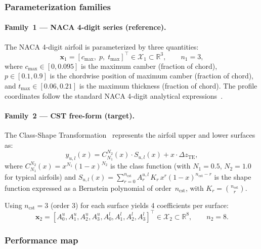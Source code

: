 \subsubsection{Parameterization families}

\paragraph{Family~1 --- NACA 4-digit series (reference).}
The NACA 4-digit airfoil is parameterized by three quantities:
\begin{equation}
    \mathbf{x}_1 = [c_{\max},\; p,\; t_{\max}]^\top \in \mathcal{X}_1 \subset \mathbb{R}^3, \qquad n_1 = 3,
    \label{eq:naca_params}
\end{equation}
where $c_{\max} \in [0, 0.095]$ is the maximum camber (fraction of chord), $p \in [0.1, 0.9]$ is the chordwise position of maximum camber (fraction of chord), and $t_{\max} \in [0.06, 0.21]$ is the maximum thickness (fraction of chord). The profile coordinates follow the standard NACA 4-digit analytical expressions~\citep{abbott1959theory}.


\paragraph{Family~2 --- CST free-form (target).}
The Class-Shape Transformation~\citep{kulfan2008universal} represents the airfoil upper and lower surfaces as:
\begin{equation}
    y_{u,l}(x) = C_{N_1}^{N_2}(x) \cdot S_{u,l}(x) + x \cdot \Delta z_{\mathrm{TE}},
\end{equation}
where $C_{N_1}^{N_2}(x) = x^{N_1}(1 - x)^{N_2}$ is the class function (with $N_1 = 0.5$, $N_2 = 1.0$ for typical airfoils) and $S_{u,l}(x) = \sum_{r=0}^{n_{\mathrm{cst}}} A_{r}^{u,l}\, K_r\, x^r (1-x)^{n_{\mathrm{cst}} - r}$ is the shape function expressed as a Bernstein polynomial of order~$n_{\mathrm{cst}}$, with $K_r = \binom{n_{\mathrm{cst}}}{r}$.

Using $n_{\mathrm{cst}} = 3$ (order 3) for each surface yields 4 coefficients per surface:
\begin{equation}
    \mathbf{x}_2 = [A_0^u, A_1^u, A_2^u, A_3^u, A_0^l, A_1^l, A_2^l, A_3^l]^\top
    \in \mathcal{X}_2 \subset \mathbb{R}^8, \qquad n_2 = 8.
    \label{eq:cst_params}
\end{equation}


\subsubsection{Performance map}

